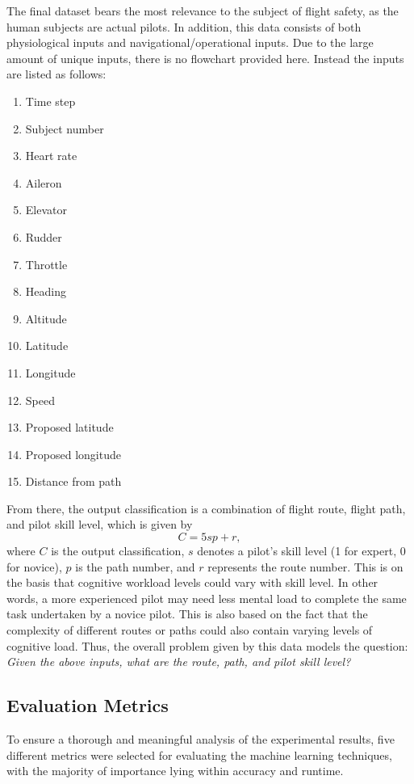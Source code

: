 \documentclass[12pt]{uthesis-v12}  %
\begin{document}
The final dataset bears the most relevance to the subject of flight safety, as the human subjects are actual pilots. In addition, this data consists of both physiological inputs and navigational/operational inputs. Due to the large amount of unique inputs, there is no flowchart provided here. Instead the inputs are listed as follows:
\begin{enumerate}
\item Time step
\item Subject number
\item Heart rate
\item Aileron
\item Elevator
\item Rudder
\item Throttle
\item Heading
\item Altitude
\item Latitude
\item Longitude
\item Speed
\item Proposed latitude
\item Proposed longitude
\item Distance from path
\end{enumerate}
From there, the output classification is a combination of flight route, flight path, and pilot skill level, which is given by
\begin{equation}
C = 5sp+r,
\end{equation}
where $C$ is the output classification, $s$ denotes a pilot's skill level (1 for expert, 0 for novice), $p$ is the path number, and $r$ represents the route number. This is on the basis that cognitive workload levels could vary with skill level. In other words, a more experienced pilot may need less mental load to complete the same task undertaken by a novice pilot. This is also based on the fact that the complexity of different routes or paths could also contain varying levels of cognitive load.
Thus, the overall problem given by this data models the question: \textit{Given the above inputs, what are the route, path, and pilot skill level?}

\subsection{Evaluation Metrics}

To ensure a thorough and meaningful analysis of the experimental results, five different metrics were selected for evaluating the machine learning techniques, with the majority of importance lying within accuracy and runtime.
\end{document}
